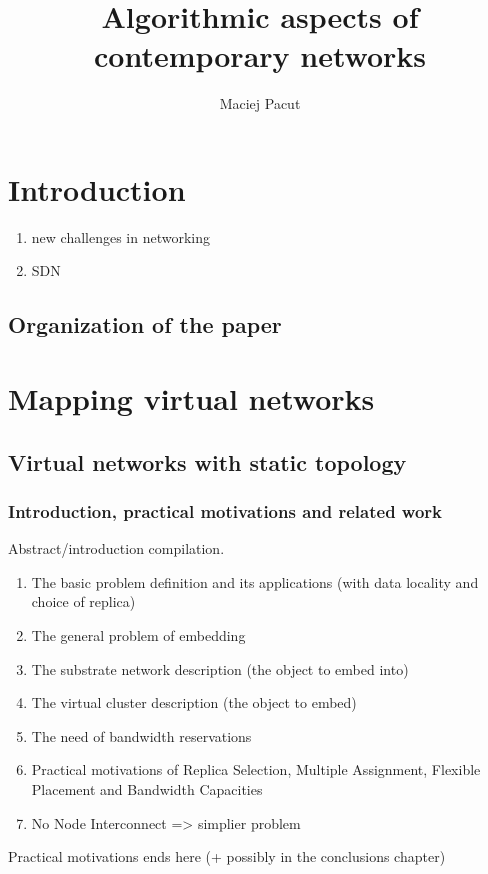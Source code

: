 \documentclass[a4paper]{article}
\title{Algorithmic aspects of contemporary networks}
\author{Maciej Pacut}
\begin{document}
\maketitle

\section{Introduction}
\begin{enumerate}
  \item new challenges in networking
  \item SDN
\end{enumerate}

\subsection{Organization of the paper}

\section{Mapping virtual networks}

\subsection{Virtual networks with static topology}

\subsubsection{Introduction, practical motivations and related work}
Abstract/introduction compilation.
\begin{enumerate}
  \item The basic problem definition and its applications (with data locality and choice of replica)
  \item The general problem of embedding
  \item The substrate network description (the object to embed into)
  \item The virtual cluster description (the object to embed)
  \item The need of bandwidth reservations
  \item Practical motivations of Replica Selection, Multiple Assignment, Flexible Placement and Bandwidth Capacities
  \item No Node Interconnect => simplier problem
\end{enumerate}
Practical motivations ends here (+ possibly in the conclusions chapter)
\end{document}
